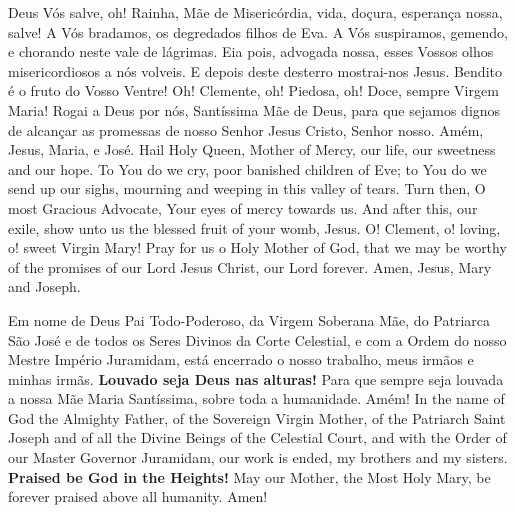   \beginverse
    Deus Vós salve, oh! Rainha, Mãe de Misericórdia,
    vida, doçura, esperança nossa, salve!
    \ind A Vós bradamos, os degredados filhos de Eva.
    \ind A Vós suspiramos, gemendo, e chorando neste
    vale de lágrimas.
    \ind Eia pois, advogada nossa, esses Vossos olhos
    misericordiosos a nós volveis.
    \ind E depois deste desterro mostrai-nos Jesus.
    \ind Bendito é o fruto do Vosso Ventre!
    \ind Oh! Clemente, oh! Piedosa, oh! Doce, sempre
    Virgem Maria!
    \ind Rogai a Deus por nós, Santíssima Mãe de Deus,
    para que sejamos dignos de alcançar as promessas
    de nosso Senhor Jesus Cristo, Senhor nosso.
    \preceparspace
    Amém, Jesus, Maria, e José.
  \endverse
  \beginverse\color{englishcolor}
    Hail Holy Queen, Mother of Mercy, our life, our
    sweetness and our hope.
    \ind To You do we cry, poor banished children of Eve;
    \ind to You do we send up our sighs, mourning and
    weeping in this valley of tears.
    \ind Turn then, O most Gracious Advocate, Your eyes
    of mercy towards us.
    \ind And after this, our exile, show unto us the
    blessed fruit of your womb, Jesus.
    \ind O! Clement, o! loving, o! sweet Virgin Mary!
    \ind Pray for us o Holy Mother of God, that we may
    be worthy of the promises of our Lord Jesus Christ,
    our Lord forever.
    \preceparspace
    Amen, Jesus, Mary and Joseph.
  \endverse
\endsong


  \beginverse
    Em nome de Deus Pai Todo-Poderoso, da Virgem
    Soberana Mãe, do Patriarca São José e de todos
    os Seres Divinos da Corte Celestial, e com
    a Ordem do nosso Mestre Império Juramidam,
    está encerrado o nosso trabalho, meus irmãos
    e minhas irmãs.
    \textbf{Louvado seja Deus nas alturas!}
    \preceparspace
    Para que sempre seja louvada a nossa Mãe Maria
    Santíssima, sobre toda a humanidade. Amém!
  \endverse
  \beginverse\color{englishcolor}
    In the name of God the Almighty Father, of the Sovereign
    Virgin Mother, of the Patriarch Saint Joseph and of all
    the Divine Beings of the Celestial Court, and with
    the Order of our Master Governor Juramidam,
    our work is ended, my brothers and my sisters.
    \textbf{Praised be God in the Heights!}
    \preceparspace
    May our Mother, the Most Holy Mary, be forever
    praised above all humanity. Amen!
  \endverse
\endsong


